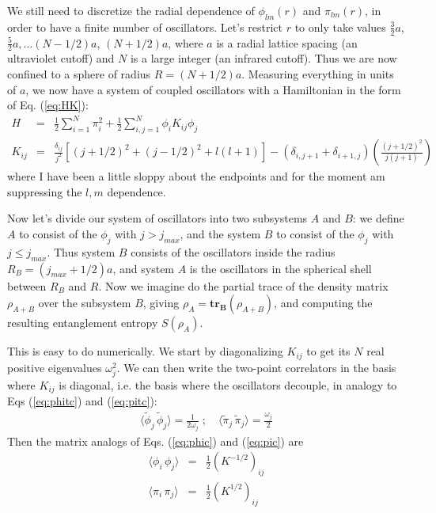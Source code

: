 \documentclass[a4paper,11pt]{article}
\begin{document}
We still need to discretize the radial dependence of $\phi_{lm}(r)$ and $\pi_{lm}(r)$, in order to have a finite number of oscillators. 
Let's restrict $r$ to only take values $\frac{3}{2}a$, $\frac{5}{2}a,\ldots (N-1/2)a$, $(N + 1/2)a$, where $a$ is a radial lattice spacing (an ultraviolet cutoff)
and $N$ is a large integer (an infrared cutoff). Thus we are now confined to a sphere of radius $R = (N+1/2)a$. Measuring everything in units of $a$, we now have
a system of coupled oscillators with a Hamiltonian in the form of Eq. (\ref{eq:HK}):
\begin{eqnarray}
H &=& \frac{1}{2} \sum_{i=1}^{N} \pi_i^2 + \frac{1}{2}  \sum_{i,j=1}^{N} \phi_i K_{ij} \phi_j \\\nonumber
K_{ij} &=& \frac{ \delta_{ij}}{j^2} \left[  (j+1/2)^2 + (j-1/2)^2  + l(l+1) \right]
-(\delta_{i,j+1} + \delta_{i+1,j}) \left(  \frac{(j+1/2)^2}{j(j+1)} \right) 
\end{eqnarray}
where I have been a little sloppy about the endpoints and for the moment am suppressing the $l,m$ dependence.

Now let's divide our system of oscillators into two subsystems $A$ and $B$: we define $A$ to consist of the $\phi_j$ with $j > j_{max}$, and
the system $B$ to consist of the $\phi_j$ with $j \leq j_{max}$. Thus system $B$ consists of the oscillators inside the radius $R_B = (j_{max} + 1/2)a$,
and system $A$ is the oscillators in the spherical shell between $R_B$ and $R$. Now we imagine do the partial trace of the density matrix $\rho_{A+B}$
over the subsystem $B$, giving $\rho_A = \bm{tr_B}(\rho_{A+B})$, and computing the resulting entanglement entropy $S(\rho_A)$.

This is easy to do numerically. We start by diagonalizing $K_{ij}$ 
to get its $N$ real positive eigenvalues $\omega_j^2$. We can then write the two-point correlators in the basis where
$K_{ij}$ is diagonal, i.e. the basis where the oscillators decouple, in analogy to Eqs (\ref{eq:phitc}) and  (\ref{eq:pitc}):
\begin{eqnarray}
\langle \tilde{\phi}_j \, \tilde{\phi}_j \rangle = \frac{1}{2\omega_j} \; ; \quad
\langle \tilde{\pi}_j \, \tilde{\pi}_j \rangle = \frac{\omega_j}{2} \label{eq:genpitc} 
\end{eqnarray}
Then the matrix analogs of Eqs. (\ref{eq:phic}) and  (\ref{eq:pic}) are
\begin{eqnarray}
 \langle \phi_i \, \phi_j \rangle &=& \frac{1}{2}\left( K^{-1/2} \right)_{ij} \label{eq:genphic}
 \\
 \langle \pi_i \, \pi_j \rangle &=&  \frac{1}{2}\left( K^{1/2} \right)_{ij}  \label{eq:genpic}
\end{eqnarray}
\end{document}

